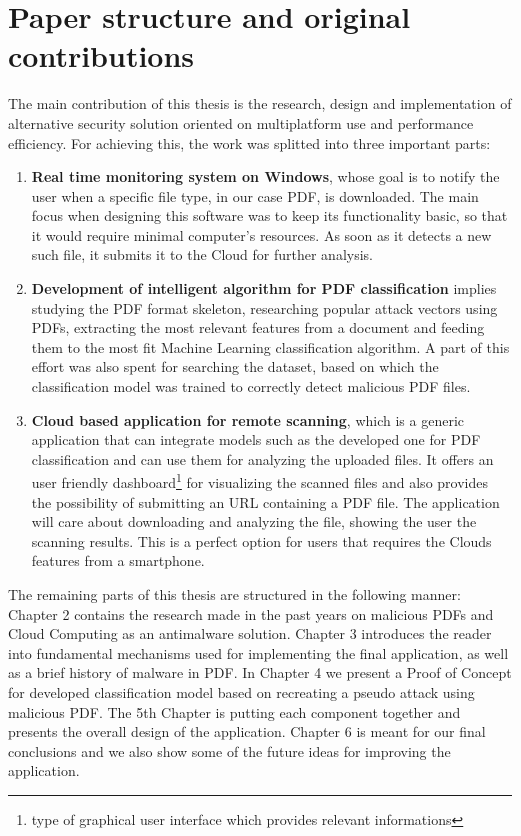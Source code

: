 \section{Paper structure and original contributions}
\label{section:structure}
The main contribution of this thesis is the research, design and implementation of alternative security solution oriented on multiplatform use and performance efficiency. For achieving this, the work was splitted into three important parts:
\begin{enumerate}
    \item \textbf{Real time monitoring system on Windows}, whose goal is to notify the user when a specific file type, in our case PDF, is downloaded. The main focus when designing this software was to keep its functionality basic, so that it would require minimal computer's resources. As soon as it detects a new such file, it submits it to the Cloud for further analysis.
    \item \textbf{Development of intelligent algorithm for PDF classification} implies studying the PDF format skeleton, researching popular attack vectors using PDFs, extracting the most relevant features from a document and feeding them to the most fit Machine Learning classification algorithm. A part of this effort was also spent for searching the dataset, based on which the classification model was trained to correctly detect malicious PDF files.
    \item \textbf{Cloud based application for remote scanning}, which is a generic application that can integrate models such as the developed one for PDF classification and can use them for analyzing the uploaded files. It offers an user friendly dashboard\footnote{type of graphical user interface which provides relevant informations} for visualizing the scanned files and also provides the possibility of submitting an URL containing a PDF file. The application will care about downloading and analyzing the file, showing the user the scanning results. This is a perfect option for users that requires the Clouds features from a smartphone.
\end{enumerate}

The remaining parts of this thesis are structured in the following manner: Chapter 2 contains the research made in the past years on malicious PDFs and Cloud Computing as an antimalware solution. Chapter 3 introduces the reader into fundamental mechanisms used for implementing the final application, as well as a brief history of malware in PDF. In Chapter 4 we present a Proof of Concept for developed classification model based on recreating a pseudo attack using malicious PDF. The 5th Chapter is putting each component together and presents the overall design of the application. Chapter 6 is meant for our final conclusions and we also show some of the future ideas for improving the application.


